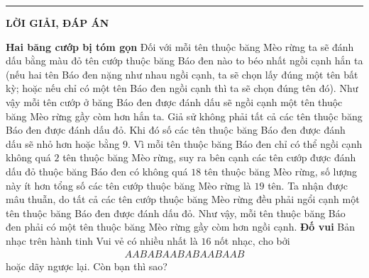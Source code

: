 \vspace*{-10pt}
{\color{thachthuctoanhoc}\rule{1\linewidth}{0.1pt}}
\vskip 0.4cm
\centerline{\LARGE{\color{thachthuctoanhoc}\textbf{LỜI GIẢI, ĐÁP ÁN}}}
\vskip 0.2cm
\begin{multicols}{2}
	\textbf{\color{thachthuctoanhoc}Hai băng cướp bị tóm gọn}
	\vskip 0.1cm
	Đối với mỗi tên thuộc băng Mèo rừng ta sẽ đánh dấu bằng màu đỏ tên cướp thuộc băng Báo đen nào to béo nhất ngồi cạnh hắn ta (nếu hai tên Báo đen nặng như nhau ngồi cạnh, ta sẽ chọn lấy đúng một tên bất kỳ; hoặc nếu chỉ có một tên Báo đen ngồi cạnh thì ta sẽ chọn đúng tên đó). Như vậy mỗi tên cướp ở băng Báo đen được đánh dấu sẽ ngồi cạnh một tên thuộc băng Mèo rừng gầy còm hơn hắn ta.
	\vskip 0.1cm
	Giả sử không phải tất cả các tên thuộc băng Báo đen được đánh dấu đỏ. Khi đó số các tên thuộc băng Báo đen được đánh dấu sẽ nhỏ hơn hoặc bằng $9$. Vì mỗi tên thuộc băng Báo đen chỉ có thể ngồi cạnh không quá $2$ tên thuộc băng Mèo rừng, suy ra bên cạnh các tên cướp được đánh dấu đỏ thuộc băng Báo đen có không quá $18$ tên thuộc băng Mèo rừng, số lượng này ít hơn tổng số các tên cướp thuộc băng Mèo rừng là $19$ tên. Ta nhận được mâu thuẫn, do tất cả các tên cướp thuộc
	băng Mèo rừng đều phải ngổi cạnh một tên thuộc băng Báo đen được đánh dấu đỏ.
	\vskip 0.1cm
	Như vậy, mỗi tên thuộc băng Báo đen phải có một tên thuộc băng Mèo rừng gầy còm hơn ngồi cạnh.
	\vskip 0.1cm
	\textbf{\color{thachthuctoanhoc}Đố vui}
	\vskip 0.1cm
	Bản nhạc trên hành tinh Vui vẻ có nhiều nhất là $16$ nốt nhạc, cho bởi  
	\begin{align*}
		AABABAABABAABAAB
	\end{align*}
	hoặc dãy ngược lại. Còn bạn thì sao?
\end{multicols}
